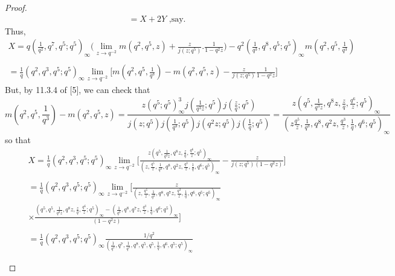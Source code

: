 \documentclass[10pt,reqno]{amsart}
\begin{document}
\begin{proof}
\begin{align*}
     =X+2Y \text{   ,say.}
 \end{align*}
 Thus,
 \begin{multline*}
     X=q(\displaystyle\frac{1}{q^2},q^7,q^5;q^5)_{\infty}\Bigg(\lim_{z\to q^{-2}}m(q^2,q^5,z)+\displaystyle\frac{z}{j(z;q^5)}.\displaystyle\frac{1}{1-q^2z}\Bigg)-q^2(\displaystyle\frac{1}{q^3},q^8,q^5;q^5)_{\infty}m(q^2,q^5,\displaystyle\frac{1}{q^3}) \\ \\
     =\displaystyle\frac{1}{q}(q^2,q^3,q^5;q^5)_{\infty}\lim_{z\to q^{-2}}\Bigg[m(q^2,q^5,\displaystyle\frac{1}{q^3})-m(q^2,q^5,z)-\displaystyle\frac{z}{j(z;q^5)}\displaystyle\frac{1}{1-q^2z}\Bigg]
 \end{multline*}
 But, by 11.3.4 of [5], we can check that
 \begin{equation*}
 m(q^2,q^5,\displaystyle\frac{1}{q^3})-m(q^2,q^5,z)=\displaystyle\frac{z(q^5;q^5)_{\infty}^3j(\displaystyle\frac{1}{q^3z};q^5)j(\displaystyle\frac{z}{q};q^5)}{j(z;q^5)j(\displaystyle\frac{1}{q^3};q^5)j(q^2z;q^5)j(\displaystyle\frac{1}{q};q^5)} =\displaystyle\frac{z(q^5,\displaystyle\frac{1}{q^3z},q^8z,\displaystyle\frac{z}{q},\displaystyle\frac{q^6}{z};q^5)_{\infty}}{(z\displaystyle\frac{q^5}{z},\displaystyle\frac{1}{q^3},q^8,q^2z,\displaystyle\frac{q^3}{z},\displaystyle\frac{1}{q},q^6;q^5)_{\infty}}
 \end{equation*}
 so that 
 \begin{multline*}
     X=\displaystyle\frac{1}{q}(q^2,q^3,q^5;q^5)_{\infty}\lim_{z\to q^{-2}}\Bigg[\displaystyle\frac{z(q^5,\displaystyle\frac{1}{q^3z},q^8z,\displaystyle\frac{z}{q},\displaystyle\frac{q^6}{z};q^5)_{\infty}}{(z,\displaystyle\frac{q^5}{z},\displaystyle\frac{1}{q^3},q^8,q^2z,\displaystyle\frac{q^3}{z},\displaystyle\frac{1}{q},q^6;q^5)_{\infty}}-\displaystyle\frac{z}{j(z;q^5)(1-q^2z)}\Bigg]\\ \\
     =\displaystyle\frac{1}{q}(q^2,q^3,q^5;q^5)_{\infty}\lim_{z\to q^{-2}}\Bigg[\displaystyle\frac{z}{(z,\displaystyle\frac{q^5}{z},\displaystyle\frac{1}{q^3},q^8,q^7z,\displaystyle\frac{q^3}{z},\displaystyle\frac{1}{q},q^6,q^5;q^5)_{\infty}}\\ 
     \times\displaystyle\frac{(q^5,q^5,\displaystyle\frac{1}{q^3z},q^8z,\displaystyle\frac{z}{q},\displaystyle\frac{q^6}{z};q^5)_{\infty}-(\displaystyle\frac{1}{q^3},q^8,q^7z,\displaystyle\frac{q^3}{z},\displaystyle\frac{1}{q},q^6;q^5)_{\infty}}{(1-q^2z)}\Bigg] \\ \\
     =\displaystyle\frac{1}{q}(q^2,q^3,q^5;q^5)_{\infty}\displaystyle\frac{1/q^2}{(\displaystyle\frac{1}{q^2},q^7,\displaystyle\frac{1}{q^3},q^8,q^5,q^5,\displaystyle\frac{1}{q},q^6,q^5;q^5)_{\infty}} \\ \\

\end{multline*}
\end{proof}
\end{document}
